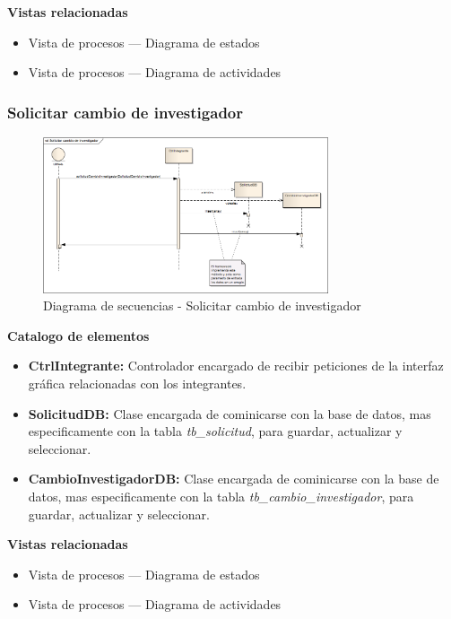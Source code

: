 \documentclass[12pt,oneside,letterpaper]{report}
\begin{document}
\textbf{Vistas relacionadas}
\begin{itemize}
 \item Vista de procesos --- Diagrama de estados
 \item Vista de procesos --- Diagrama de actividades
\end{itemize}

\subsubsection{Solicitar cambio de investigador}

\begin{figure}[h!]
  \centering
    \includegraphics[width=0.75\textwidth]{./img/img17.png}
  \caption{Diagrama de secuencias - Solicitar cambio de investigador}
\end{figure}

\textbf{Catalogo de elementos}

\begin{itemize}
 \item \textbf{CtrlIntegrante:} Controlador encargado de recibir peticiones de la interfaz gráfica relacionadas con los integrantes.
 \item \textbf{SolicitudDB:} Clase encargada de cominicarse con la base de datos, mas especificamente con la tabla \textit{tb\_solicitud}, para guardar, actualizar y seleccionar.
 \item \textbf{CambioInvestigadorDB:} Clase encargada de cominicarse con la base de datos, mas especificamente con la tabla \textit{tb\_cambio\_investigador}, para guardar, actualizar y seleccionar.
\end{itemize}

\textbf{Vistas relacionadas}
\begin{itemize}
 \item Vista de procesos --- Diagrama de estados
 \item Vista de procesos --- Diagrama de actividades
\end{itemize}
\end{document}
